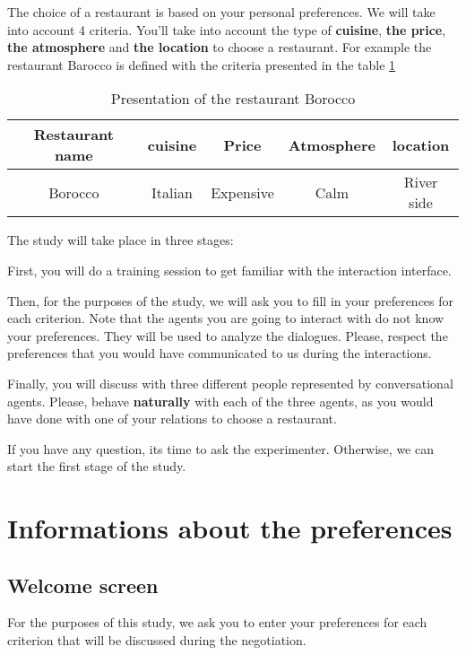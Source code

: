 \documentclass [french]{paper}
\begin{document}
			The choice of a restaurant is based on your personal preferences. We will take into account 4 criteria. You'll take into account the type of \textbf {cuisine}, \textbf {the price}, \textbf {the atmosphere} and \textbf {the location} to choose a restaurant. For example the restaurant Barocco is defined with the criteria presented in the table \ref{teb:exEn}
			
				\begin{table}[h]
			\begin{tabular} {|c|c|c|c|c|}
				\hline
				Restaurant name & cuisine & Price & Atmosphere & location \\
				\hline
				Borocco & Italian & Expensive & Calm & River side \\
				\hline 
			\end{tabular}
			\label{teb:exEn}
			\caption{Presentation of the restaurant Borocco}
		\end{table}
		
		The study will take place in three stages:
		
		First, you will do a training session to get familiar with the interaction interface.
		
		Then, for the purposes of the study, we will ask you to fill in your preferences for each criterion.  Note that the agents you are going to interact with do not know your preferences. They will be used to analyze the dialogues. Please, respect the preferences that you would have communicated to us during the interactions.
	
		
		Finally, you will discuss with three different people represented by conversational agents. Please, behave \textbf{naturally} with each of the three agents, as you would have done with one of your relations to choose a restaurant.
	
		If you have any question, its time to ask the experimenter. Otherwise, we can start the first stage of the study.
	
		\section{Informations about the preferences}
			\subsection{Welcome screen}
		
			For the purposes of this study, we ask you to enter your preferences for each criterion that will be discussed during the negotiation.
			
\end{document}

